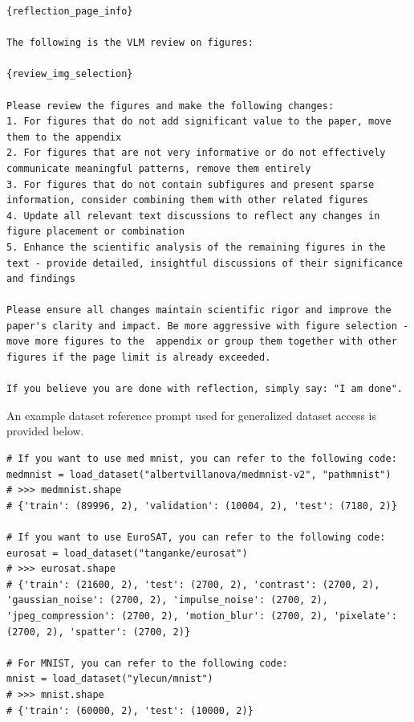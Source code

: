 \begin{appendices}
\begin{tcolorbox}[breakable, colback=orange!5!white, colframe=orange!80!black, title=VLM-Assisted Manuscript Figure Reflection Prompt]
\begin{Verbatim}[breaklines, breaksymbol={}, breaksymbolleft={}, fontsize=\small]
{reflection_page_info}

The following is the VLM review on figures:

{review_img_selection}

Please review the figures and make the following changes:
1. For figures that do not add significant value to the paper, move them to the appendix
2. For figures that are not very informative or do not effectively  communicate meaningful patterns, remove them entirely
3. For figures that do not contain subfigures and present sparse information, consider combining them with other related figures
4. Update all relevant text discussions to reflect any changes in figure placement or combination
5. Enhance the scientific analysis of the remaining figures in the text - provide detailed, insightful discussions of their significance and findings

Please ensure all changes maintain scientific rigor and improve the paper's clarity and impact. Be more aggressive with figure selection - move more figures to the  appendix or group them together with other figures if the page limit is already exceeded.

If you believe you are done with reflection, simply say: "I am done".
\end{Verbatim}
\end{tcolorbox}

An example dataset reference prompt used for generalized dataset access is provided below.
\begin{tcolorbox}[breakable, colback=orange!5!white, colframe=orange!80!black, title=The dataset reference prompt for generalized dataset access]
\begin{Verbatim}[breaklines, breaksymbol={}, breaksymbolleft={}, fontsize=\small]
# If you want to use med mnist, you can refer to the following code:
medmnist = load_dataset("albertvillanova/medmnist-v2", "pathmnist")
# >>> medmnist.shape
# {'train': (89996, 2), 'validation': (10004, 2), 'test': (7180, 2)}

# If you want to use EuroSAT, you can refer to the following code:
eurosat = load_dataset("tanganke/eurosat")
# >>> eurosat.shape
# {'train': (21600, 2), 'test': (2700, 2), 'contrast': (2700, 2), 'gaussian_noise': (2700, 2), 'impulse_noise': (2700, 2), 'jpeg_compression': (2700, 2), 'motion_blur': (2700, 2), 'pixelate': (2700, 2), 'spatter': (2700, 2)}

# For MNIST, you can refer to the following code:
mnist = load_dataset("ylecun/mnist")
# >>> mnist.shape
# {'train': (60000, 2), 'test': (10000, 2)}


\end{Verbatim}
\end{tcolorbox}
\end{appendices}
